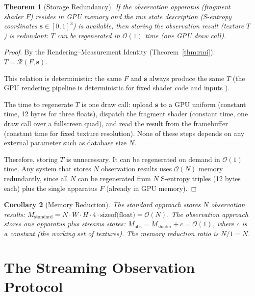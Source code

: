 \documentclass[11pt,twocolumn,a4paper]{article}
\newtheorem{theorem}{Theorem}[section]
\newtheorem{corollary}[theorem]{Corollary}
\newcommand{\BigO}{\mathcal{O}}
\newcommand{\Rend}{\mathcal{R}}
\begin{document}
\begin{theorem}[Storage Redundancy]
\label{thm:storage-redundancy}
If the observation apparatus (fragment shader $F$) resides in GPU
memory and the raw state description (S-entropy coordinates
$\bm{s} \in [0,1]^3$) is available, then storing the observation
result (texture $T$) is redundant: $T$ can be regenerated in
$\BigO(1)$ time (one GPU draw call).
\end{theorem}

\begin{proof}
By the Rendering--Measurement Identity (Theorem~\ref{thm:rmi}):
$T = \Rend(F, \bm{s})$.

This relation is deterministic: the same $F$ and $\bm{s}$ always
produce the same $T$ (the GPU rendering pipeline is
deterministic for fixed shader code and inputs
\citep{khronosglsl,khronosvulkan}).

The time to regenerate $T$ is one draw call: upload $\bm{s}$ to a
GPU uniform (constant time, 12 bytes for three floats), dispatch
the fragment shader (constant time, one draw call over a fullscreen
quad), and read the result from the framebuffer (constant time for
fixed texture resolution). None of these steps depends on any
external parameter such as database size $N$.

Therefore, storing $T$ is unnecessary. It can be regenerated on
demand in $\BigO(1)$ time. Any system that stores $N$ observation
results uses $\BigO(N)$ memory redundantly, since all $N$ can be
regenerated from $N$ S-entropy triples (12 bytes each) plus the
single apparatus $F$ (already in GPU memory). \qedhere
\end{proof}

\begin{corollary}[Memory Reduction]
\label{cor:memory-reduction}
The standard approach stores $N$ observation results:
$M_{\mathrm{standard}} = N \cdot W \cdot H \cdot 4 \cdot
\text{sizeof(float)} = \BigO(N)$.
The observation approach stores one apparatus plus streams states:
$M_{\mathrm{obs}} = M_{\mathrm{shader}} + c = \BigO(1)$,
where $c$ is a constant (the working set of textures).
The memory reduction ratio is $N / 1 = N$.
\end{corollary}


\section{The Streaming Observation Protocol}
\label{sec:streaming}
\end{document}
